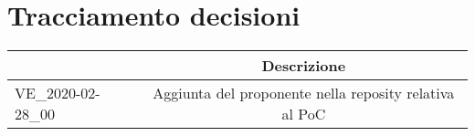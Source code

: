 \section{Tracciamento decisioni}
\renewcommand{\arraystretch}{1.8}

\begin{longtable}{|p{5cm}|c|}
	\hline
	
	\rowcolor{header}
	\centering{\textbf{Codice}} & \textbf{Descrizione} \\
	
	\hline
	
	VE\_2020-02-28\_00 & Aggiunta del proponente nella reposity relativa al PoC \\
	
	\hline
\end{longtable}